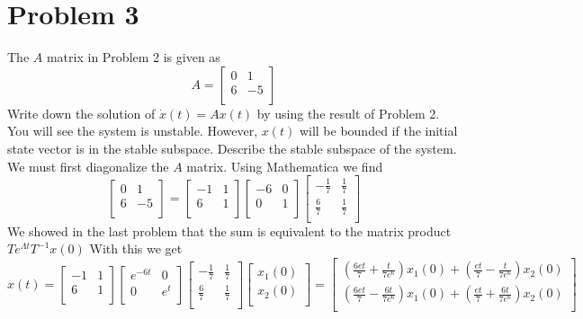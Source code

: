 \documentclass{article}
\begin{document}
\section*{Problem 3}
The $A$ matrix in Problem 2 is given as
$$ A =
\begin{bmatrix}
0 & 1 \\
6 & -5 \\
\end{bmatrix}
$$
Write down the solution of $\dot{x}(t) = Ax(t)$ by using the result of Problem 2.
You will see the system is unstable.
However, $x(t)$ will be bounded if the initial state vector is in the stable subspace.
Describe the stable subspace of the system.
\newline
We must first diagonalize the $A$ matrix.
Using Mathematica we find
$$
\begin{bmatrix}
0 & 1 \\
6 & -5 \\
\end{bmatrix}
=
\begin{bmatrix}
 -1 & 1 \\
  6 & 1 \\
\end{bmatrix}
\begin{bmatrix}
 -6 & 0 \\
  0 & 1 \\
\end{bmatrix}
\begin{bmatrix}
 -\frac{1}{7} & \frac{1}{7} \\
  \frac{6}{7} & \frac{1}{7} \\
\end{bmatrix}
$$
We showed in the last problem that the sum is equivalent to the matrix product
$ Te^{\Lambda t}T^{-1} x(0)$
With this we get
$$
x(t) =
\begin{bmatrix}
 -1 & 1 \\
  6 & 1 \\
\end{bmatrix}
\begin{bmatrix}
 e^{-6 t} & 0 \\
  0 & e^t \\
\end{bmatrix}
\begin{bmatrix}
 -\frac{1}{7} & \frac{1}{7} \\
  \frac{6}{7} & \frac{1}{7} \\
\end{bmatrix}
\begin{bmatrix}
x_1(0) \\
x_2(0) \\
\end{bmatrix}
=
\begin{bmatrix}
\left(\frac{6 e t}{7}+\frac{t}{7 e^6}\right) x_1(0)+\left(\frac{e t}{7}-\frac{t}{7 e^6}\right) x_2(0) \\
\left(\frac{6 e t}{7}-\frac{6 t}{7 e^6}\right) x_1(0)+\left(\frac{e t}{7}+\frac{6 t}{7 e^6}\right) x_2(0) \\
\end{bmatrix}
$$
\end{document}
